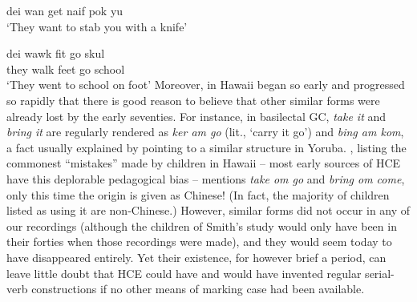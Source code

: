 \ea\label{ex:2:263}
dei wan get naif pok yu\\
\glt `They want to stab you with a knife'
\z

\ea\label{ex:2:264}
\gll dei wawk fit go skul\\
they walk feet go school\\
\glt `They went to school on foot'
\z
Moreover,  in Hawaii began so early and progressed so rapidly that there is good reason to believe that other similar forms were already lost by the early seventies. For instance, in basilectal GC, \textit{take it} and \textit{bring it} are regularly rendered as \textit{ker am go} (lit., `carry it go') and \textit{bing am kom}, a fact usually explained by pointing to a similar structure in Yoruba. \citet{Smith1939}, listing the commonest ``mistakes''
made by children in Hawaii -- most early sources of HCE have this deplorable pedagogical bias -- mentions \textit{take om go} and \textit{bring om come}, only this time the origin is given as Chinese! (In fact, the majority of children listed as using it are non-Chinese.) However, similar forms did not occur in any of our recordings (although the children of Smith's study would only have been in their forties when those recordings were made), and they would seem today to have disappeared entirely. Yet their existence, for however brief a period, can leave little doubt that HCE could have and would have invented regular serial-verb constructions if no other means of marking case had been available.
